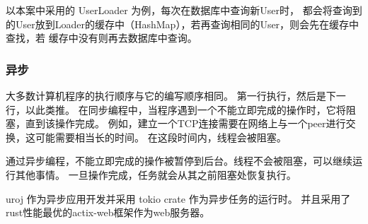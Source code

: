 以本案中采用的 UserLoader 为例，每次在数据库中查询新User时，
都会将查询到的User放到Loader的缓存中（HashMap），若再查询相同的User，则会先在缓存中查找，若
缓存中没有则再去数据库中查询。

\subsubsection{异步}
大多数计算机程序的执行顺序与它的编写顺序相同。
第一行执行，然后是下一行，以此类推。
在同步编程中，当程序遇到一个不能立即完成的操作时，它将阻塞，直到该操作完成。
例如，建立一个TCP连接需要在网络上与一个peer进行交换，这可能需要相当长的时间。
在这段时间内，线程会被阻塞。

通过异步编程，不能立即完成的操作被暂停到后台。线程不会被阻塞，可以继续运行其他事情。
一旦操作完成，任务就会从其之前阻塞处恢复执行。

uroj 作为异步应用开发并采用 tokio crate 作为异步任务的运行时。
并且采用了rust性能最优的actix-web框架作为web服务器。